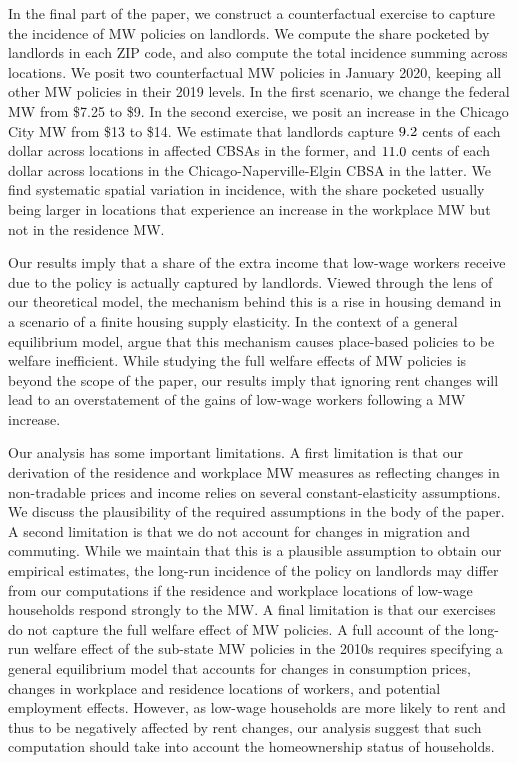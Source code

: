 
In the final part of the paper, we construct a counterfactual exercise to 
capture the incidence of MW policies on landlords.
We compute the share pocketed by landlords in each ZIP code, and also
compute the total incidence summing across locations.
We posit two counterfactual MW policies in January 2020, keeping all other
MW policies in their 2019 levels.
In the first scenario, we change the federal MW from \$7.25 to \$9.
In the second exercise, we posit an increase in the Chicago City MW 
from \$13 to \$14.
We estimate that landlords capture $\textnormal{9.2}$ cents of each 
dollar across locations in affected CBSAs in the former, and 
$\textnormal{11.0}$ cents of each dollar across locations in the 
Chicago-Naperville-Elgin CBSA in the latter.
We find systematic spatial variation in incidence,
with the share pocketed usually being larger in locations that experience an
increase in the workplace MW but not in the residence MW.

Our results imply that a share of the extra income that low-wage workers
receive due to the policy is actually captured by landlords.
Viewed through the lens of our theoretical model,
the mechanism behind this is a rise in housing demand in a scenario of a 
finite housing supply elasticity.
In the context of a general equilibrium model, \textcite{KlineMoretti2014} argue
that this mechanism causes place-based policies to be welfare inefficient.
While studying the full welfare effects of MW policies is beyond the scope of 
the paper, our results imply that ignoring rent changes will lead to an 
overstatement of the gains of low-wage workers following a MW increase.


Our analysis has some important limitations.
A first limitation is that our derivation of the residence and workplace MW
measures as reflecting changes in non-tradable prices and income relies on 
several constant-elasticity assumptions.
We discuss the plausibility of the required assumptions in the body of the paper.
A second limitation is that we do not account for changes in migration and 
commuting.
While we maintain that this is a plausible assumption to obtain our empirical 
estimates, the long-run incidence of the policy on landlords may differ from our 
computations if the residence and workplace locations of low-wage households 
respond strongly to the MW.
A final limitation is that our exercises do not capture the full welfare 
effect of MW policies.
A full account of the long-run welfare effect of the sub-state MW policies in 
the 2010s requires specifying a general equilibrium model that accounts for 
changes in consumption prices, changes in workplace and residence locations
of workers, and potential employment effects.
However, as low-wage households are more likely to rent and thus to be 
negatively affected by rent changes, our analysis suggest that such computation 
should take into account the homeownership status of households.


